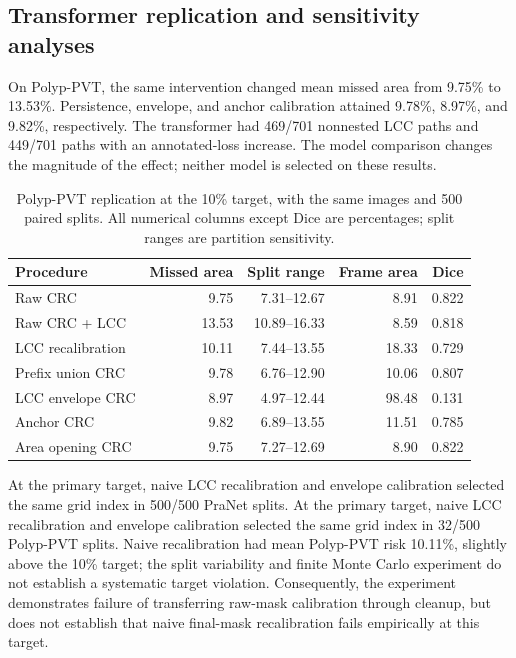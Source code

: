 \subsection{Transformer replication and sensitivity analyses}
On Polyp-PVT, the same intervention changed mean missed area from 9.75\% to 13.53\%. Persistence, envelope, and anchor calibration attained 9.78\%, 8.97\%, and 9.82\%, respectively. The transformer had 469/701 nonnested LCC paths and 449/701 paths with an annotated-loss increase. The model comparison changes the magnitude of the effect; neither model is selected on these results.

\begin{table}[htbp]\centering\small
\caption{Polyp-PVT replication at the 10\% target, with the same images and 500 paired splits. All numerical columns except Dice are percentages; split ranges are partition sensitivity.}
\label{tab:pvt}\begin{tabular}{lrrrr}\toprule
Procedure & Missed area & Split range & Frame area & Dice\\\midrule
Raw CRC & 9.75 & 7.31--12.67 & 8.91 & 0.822 \\
Raw CRC + LCC & 13.53 & 10.89--16.33 & 8.59 & 0.818 \\
LCC recalibration & 10.11 & 7.44--13.55 & 18.33 & 0.729 \\
Prefix union CRC & 9.78 & 6.76--12.90 & 10.06 & 0.807 \\
LCC envelope CRC & 8.97 & 4.97--12.44 & 98.48 & 0.131 \\
Anchor CRC & 9.82 & 6.89--13.55 & 11.51 & 0.785 \\
Area opening CRC & 9.75 & 7.27--12.69 & 8.90 & 0.822 \\
\bottomrule\end{tabular}\end{table}

At the primary target, naive LCC recalibration and envelope calibration selected the same grid index in 500/500 PraNet splits. At the primary target, naive LCC recalibration and envelope calibration selected the same grid index in 32/500 Polyp-PVT splits. Naive recalibration had mean Polyp-PVT risk 10.11\%, slightly above the 10\% target; the split variability and finite Monte Carlo experiment do not establish a systematic target violation. Consequently, the experiment demonstrates failure of transferring raw-mask calibration through cleanup, but does not establish that naive final-mask recalibration fails empirically at this target.


